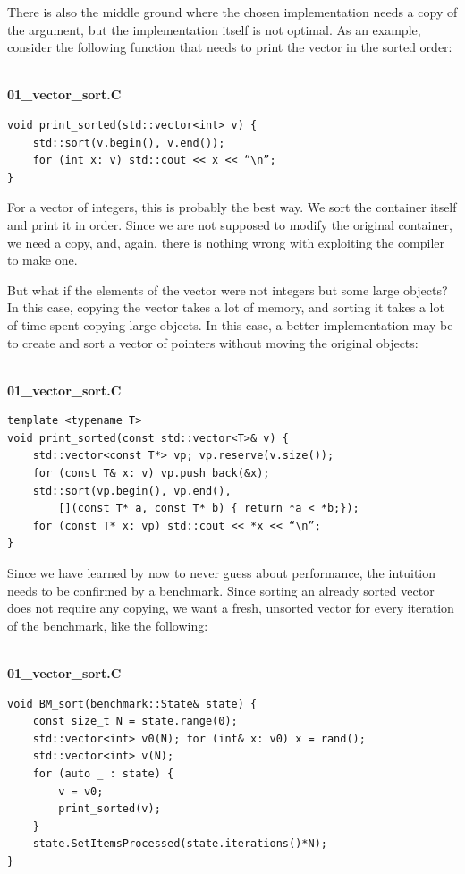 
There is also the middle ground where the chosen implementation needs a copy of the argument, but the implementation itself is not optimal. As an example, consider the following function that needs to print the vector in the sorted order:

\hspace*{\fill} \\ %
\noindent
\textbf{01\_vector\_sort.C}
\begin{lstlisting}[style=styleCXX]
void print_sorted(std::vector<int> v) {
	std::sort(v.begin(), v.end());
	for (int x: v) std::cout << x << “\n”;
}
\end{lstlisting}

For a vector of integers, this is probably the best way. We sort the container itself and print it in order. Since we are not supposed to modify the original container, we need a copy, and, again, there is nothing wrong with exploiting the compiler to make one.

But what if the elements of the vector were not integers but some large objects? In this case, copying the vector takes a lot of memory, and sorting it takes a lot of time spent copying large objects. In this case, a better implementation may be to create and sort a vector of pointers without moving the original objects:

\hspace*{\fill} \\ %
\noindent
\textbf{01\_vector\_sort.C}
\begin{lstlisting}[style=styleCXX]
template <typename T>
void print_sorted(const std::vector<T>& v) {
	std::vector<const T*> vp; vp.reserve(v.size());
	for (const T& x: v) vp.push_back(&x);
	std::sort(vp.begin(), vp.end(), 
		[](const T* a, const T* b) { return *a < *b;});
	for (const T* x: vp) std::cout << *x << “\n”;
}
\end{lstlisting}

Since we have learned by now to never guess about performance, the intuition needs to be confirmed by a benchmark. Since sorting an already sorted vector does not require any copying, we want a fresh, unsorted vector for every iteration of the benchmark, like the following:

\hspace*{\fill} \\ %
\noindent
\textbf{01\_vector\_sort.C}
\begin{lstlisting}[style=styleCXX]
void BM_sort(benchmark::State& state) {
	const size_t N = state.range(0);
	std::vector<int> v0(N); for (int& x: v0) x = rand();
	std::vector<int> v(N);
	for (auto _ : state) {
		v = v0;
		print_sorted(v);
	}
	state.SetItemsProcessed(state.iterations()*N);
}
\end{lstlisting}

